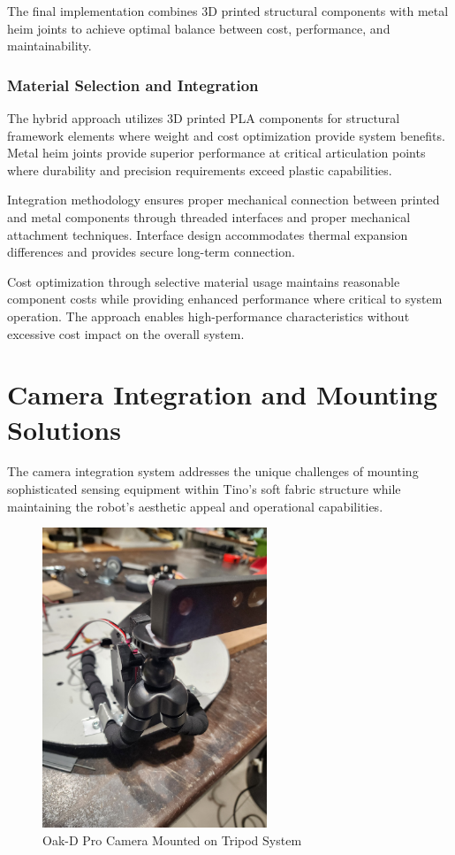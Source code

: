 The final implementation combines 3D printed structural components with metal heim joints to achieve optimal balance between cost, performance, and maintainability.

\subsubsection{Material Selection and Integration}

The hybrid approach utilizes 3D printed PLA components for structural framework elements where weight and cost optimization provide system benefits. Metal heim joints provide superior performance at critical articulation points where durability and precision requirements exceed plastic capabilities.

Integration methodology ensures proper mechanical connection between printed and metal components through threaded interfaces and proper mechanical attachment techniques. Interface design accommodates thermal expansion differences and provides secure long-term connection.

Cost optimization through selective material usage maintains reasonable component costs while providing enhanced performance where critical to system operation. The approach enables high-performance characteristics without excessive cost impact on the overall system.

\section{Camera Integration and Mounting Solutions}

The camera integration system addresses the unique challenges of mounting sophisticated sensing equipment within Tino's soft fabric structure while maintaining the robot's aesthetic appeal and operational capabilities.

\begin{figure}[H]
    \centering
    \includegraphics[width=0.6\textwidth, angle=-90]{Images/TripodOnHeadCamera.jpg}
    \caption{Oak-D Pro Camera Mounted on Tripod System}
    \label{fig:tripod_camera_mount}
\end{figure}

